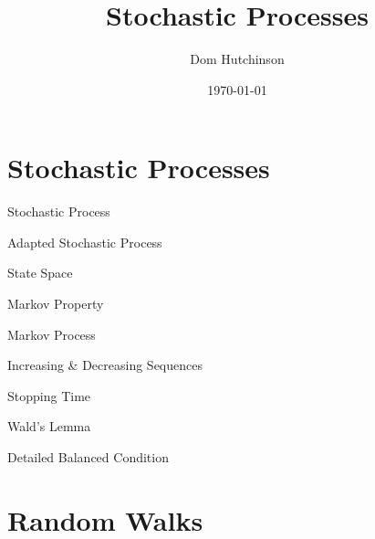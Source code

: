 \documentclass[11pt,a4paper]{article}
\begin{document}
\title{Stochastic Processes}
\author{Dom Hutchinson}
\date{\today}
\maketitle

\section{Stochastic Processes}

\begin{definition}{Stochastic Process}
\end{definition}

\begin{definition}{Adapted Stochastic Process}

\end{definition}

\begin{definition}{State Space}

\end{definition}

\begin{definition}{Markov Property}

\end{definition}

\begin{definition}{Markov Process}

\end{definition}

\begin{definition}{Increasing \& Decreasing Sequences}

\end{definition}

\begin{definition}{Stopping Time}

\end{definition}

\begin{theorem}{Wald's Lemma}

\end{theorem}

\begin{definition}{Detailed Balanced Condition}

\end{definition}

\section{Random Walks}
\end{document}
